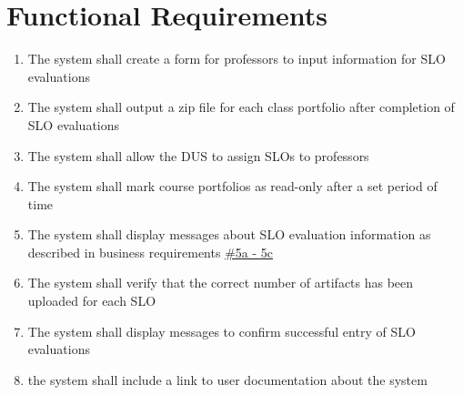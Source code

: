\documentclass[a4paper,12pt]{article}
\begin{document}
\section*{Functional Requirements}
\begin{enumerate}
\item The system shall create a form for professors to input information for SLO evaluations
\item The system shall output a zip file for each class portfolio after completion of SLO evaluations
\item The system shall allow the DUS to assign SLOs to professors
\item The system shall mark course portfolios as read-only after a set period of time
\item The system shall display messages about SLO evaluation information as described in business requirements \hyperref[item:b5]{\#5a - 5c}
\item The system shall verify that the correct number of artifacts has been uploaded for each SLO
\item The system shall display messages to confirm successful entry of SLO evaluations 
\item the system shall include a link to user documentation about the system
\end{enumerate}
\end{document}
